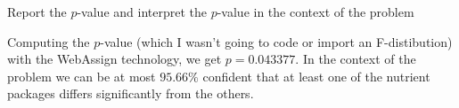 Report the $p$-value and interpret the $p$-value in the context of the problem

\soln* Computing the $p$-value (which I wasn't going to code or import an F-distibution) with the WebAssign technology, we get $p = 0.043377$. In the context of the problem we can be at most $95.66\%$ confident that at least one of the nutrient packages differs significantly from the others.